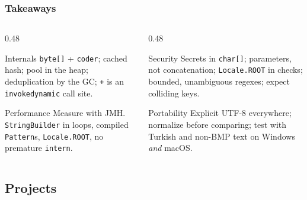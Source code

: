 \documentclass[aspectratio=169,10pt,compress]{beamer}
\begin{document}
\begin{frame}[t,fragile] \frametitle{Takeaways}
  \begin{columns}[T]
    \begin{column}{0.48\textwidth}
      \begin{block}{Internals}
        \small \texttt{byte[]} + \texttt{coder}; cached hash; pool in the heap; deduplication by the GC;
        \texttt{+} is an \texttt{invokedynamic} call site.
      \end{block}
      \begin{block}{Performance}
        \small Measure with JMH. \texttt{StringBuilder} in loops, compiled \texttt{Pattern}s, \texttt{Locale.ROOT},
        no premature \texttt{intern}.
      \end{block}
    \end{column}
    \begin{column}{0.48\textwidth}
      \begin{alertblock}{Security}
        \small Secrets in \texttt{char[]}; parameters, not concatenation; \texttt{Locale.ROOT} in checks;
        bounded, unambiguous regexes; expect colliding keys.
      \end{alertblock}
      \begin{block}{Portability}
        \small Explicit UTF-8 everywhere; normalize before comparing; test with Turkish and non-BMP text on
        Windows \emph{and} macOS.
      \end{block}
    \end{column}
  \end{columns}
\end{frame}

\subsection[Projects]{Projects}
\end{document}
